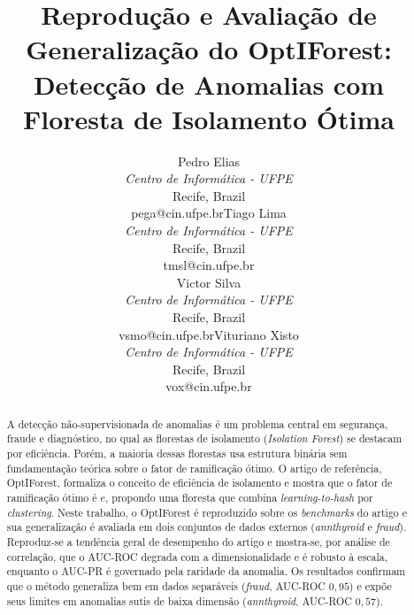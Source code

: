 \documentclass[conference]{IEEEtran}
\begin{document}
\title{Reprodu\c{c}\~ao e Avalia\c{c}\~ao de Generaliza\c{c}\~ao do OptIForest:\\
Detec\c{c}\~ao de Anomalias com Floresta de Isolamento \'Otima}

\author{%
\IEEEauthorblockN{}%
\centering
\begin{tabular}{c@{\hskip 5em}c}
\shortstack{Pedro Elias\\[2pt]
\textit{Centro de Inform\'atica - UFPE}\\
Recife, Brazil\\
pega@cin.ufpe.br}
&
\shortstack{Tiago Lima\\[2pt]
\textit{Centro de Inform\'atica - UFPE}\\
Recife, Brazil\\
tmsl@cin.ufpe.br}
\\[3ex]
\shortstack{Victor Silva\\[2pt]
\textit{Centro de Inform\'atica - UFPE}\\
Recife, Brazil\\
vsmo@cin.ufpe.br}
&
\shortstack{Vituriano Xisto\\[2pt]
\textit{Centro de Inform\'atica - UFPE}\\
Recife, Brazil\\
vox@cin.ufpe.br}
\end{tabular}
}

\maketitle

\begin{abstract}
A detec\c{c}\~ao n\~ao-supervisionada de anomalias \'e um problema central em
seguran\c{c}a, fraude e diagn\'ostico, no qual as florestas de isolamento
(\emph{Isolation Forest}) se destacam por efici\^encia. Por\'em, a maioria dessas
florestas usa estrutura bin\'aria sem fundamenta\c{c}\~ao te\'orica sobre o fator
de ramifica\c{c}\~ao \'otimo. O artigo de refer\^encia, OptIForest, formaliza
o conceito de efici\^encia de isolamento e mostra que o fator de ramifica\c{c}\~ao
\'otimo \'e $e$, propondo uma floresta que combina \emph{learning-to-hash} por
\emph{clustering}. Neste trabalho, o OptIForest \'e reproduzido sobre os
\emph{benchmarks} do artigo e sua generaliza\c{c}\~ao \'e avaliada em dois conjuntos
de dados externos (\emph{annthyroid} e \emph{fraud}). Reproduz-se a tend\^encia
geral de desempenho do artigo e mostra-se, por an\'alise de correla\c{c}\~ao, que o
AUC-ROC degrada com a dimensionalidade e \'e robusto \`a escala, enquanto o AUC-PR
\'e governado pela raridade da anomalia. Os resultados confirmam que o m\'etodo
generaliza bem em dados separ\'aveis (\emph{fraud}, AUC-ROC $0{,}95$) e exp\~oe seus
limites em anomalias sutis de baixa dimens\~ao (\emph{annthyroid}, AUC-ROC $0{,}57$).
\end{abstract}
\end{document}
